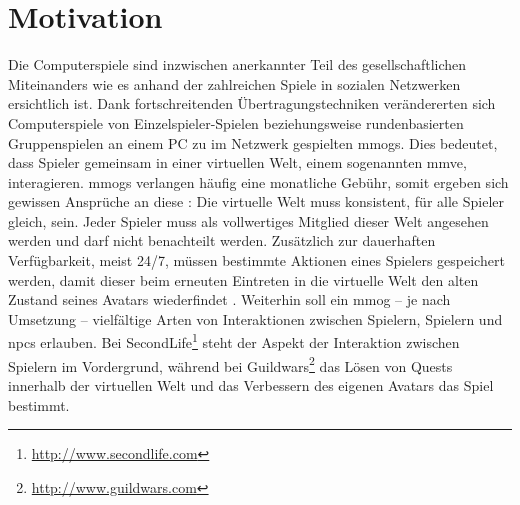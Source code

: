 \chapter{Motivation}
\label{chap:einleitung}
Die Computerspiele sind inzwischen anerkannter Teil des gesellschaftlichen Miteinanders wie es anhand der zahlreichen Spiele in sozialen Netzwerken ersichtlich ist. Dank fortschreitenden Übertragungs\-techniken verändererten sich Computerspiele von Einzelspieler-Spielen beziehungsweise rundenbasierten Gruppenspielen an einem PC zu im Netzwerk gespielten \acp{mmog}. Dies bedeutet, dass Spieler gemeinsam in einer virtuellen Welt, einem sogenannten \ac{mmve}, interagieren. \acp{mmog} verlangen häufig eine monatliche Gebühr, somit ergeben sich gewissen Ansprüche an diese \cite{Fischer2010a}: Die virtuelle Welt muss konsistent, für alle Spieler gleich, sein. Jeder Spieler muss als vollwertiges Mitglied dieser Welt angesehen werden und darf nicht benachteilt werden. Zusätzlich zur dauerhaften Verfügbarkeit, meist 24/7, müssen bestimmte Aktionen eines Spielers gespeichert werden, damit dieser beim erneuten Eintreten in die virtuelle Welt den alten Zustand seines Avatars wiederfindet \cite{Zhang2008Persistence}. Weiterhin soll ein \ac{mmog} -- je nach Umsetzung -- vielfältige Arten von Interaktionen zwischen Spielern, Spielern und \acp{npc} erlauben. Bei SecondLife\footnote{\url{http://www.secondlife.com}} steht der Aspekt der Interaktion zwischen Spielern im Vordergrund, während bei Guildwars\footnote{\url{http://www.guildwars.com}} das Lösen von Quests innerhalb der virtuellen Welt und das Verbessern des eigenen Avatars das Spiel bestimmt.

